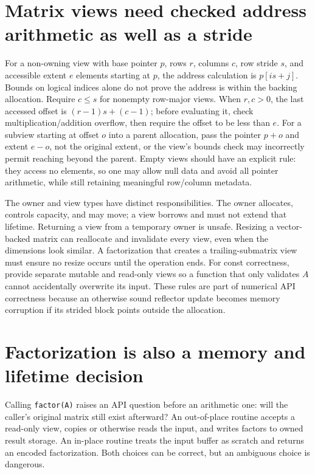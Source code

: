 \section{Matrix views need checked address arithmetic as well as a stride}\label{02-foundations-ii-ch038-matrix-views-need-checked-address-arithmetic-as-well-as-a-stride}

For a non-owning view with base pointer \(p\), rows \(r\), columns \(c\), row stride \(s\), and accessible extent \(e\) elements starting at \(p\), the address calculation is \(p[i s+j]\). Bounds on logical indices alone do not prove the address is within the backing allocation. Require \(c\le s\) for nonempty row-major views. When \(r,c>0\), the last accessed offset is \((r-1)s+(c-1)\); before evaluating it, check multiplication/addition overflow, then require the offset to be less than \(e\). For a subview starting at offset \(o\) into a parent allocation, pass the pointer \(p+o\) and extent \(e-o\), not the original extent, or the view's bounds check may incorrectly permit reaching beyond the parent. Empty views should have an explicit rule: they access no elements, so one may allow null data and avoid all pointer arithmetic, while still retaining meaningful row/column metadata.

The owner and view types have distinct responsibilities. The owner allocates, controls capacity, and may move; a view borrows and must not extend that lifetime. Returning a view from a temporary owner is unsafe. Resizing a vector-backed matrix can reallocate and invalidate every view, even when the dimensions look similar. A factorization that creates a trailing-submatrix view must ensure no resize occurs until the operation ends. For const correctness, provide separate mutable and read-only views so a function that only validates \(A\) cannot accidentally overwrite its input. These rules are part of numerical API correctness because an otherwise sound reflector update becomes memory corruption if its strided block points outside the allocation.

\section{Factorization is also a memory and lifetime decision}\label{02-foundations-ii-ch038-factorization-is-also-a-memory-and-lifetime-decision}

Calling \texttt{factor(A)} raises an API question before an arithmetic one: will the caller's original matrix still exist afterward? An out-of-place routine accepts a read-only view, copies or otherwise reads the input, and writes factors to owned result storage. An in-place routine treats the input buffer as scratch and returns an encoded factorization. Both choices can be correct, but an ambiguous choice is dangerous.

